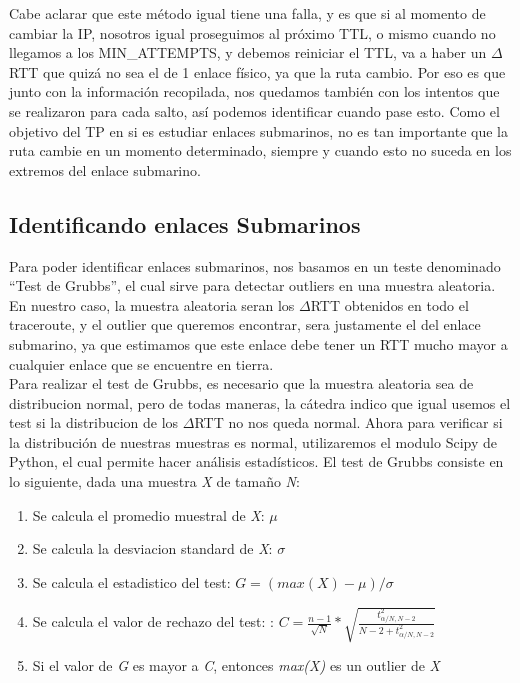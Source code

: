 Cabe aclarar que este método igual tiene una falla, y es que si al momento de cambiar la IP, nosotros igual proseguimos al próximo TTL, o mismo cuando no llegamos a los MIN\_ATTEMPTS, y debemos reiniciar el TTL, va a haber un $\Delta$RTT que quizá no sea el de 1 enlace físico, ya que la ruta cambio. Por eso es que junto con la información recopilada, nos quedamos también con los intentos que se realizaron para cada salto, así podemos identificar cuando pase esto. Como el objetivo del TP en si es estudiar enlaces submarinos, no es tan importante que la ruta cambie en un momento determinado, siempre y cuando esto no suceda en los extremos del enlace submarino.

\subsection{Identificando enlaces Submarinos}

Para poder identificar enlaces submarinos, nos basamos en un teste denominado ``Test de Grubbs'', el cual sirve para detectar outliers en una muestra aleatoria. En nuestro caso, la muestra aleatoria seran los $\Delta$RTT obtenidos en todo el traceroute, y el outlier que queremos encontrar, sera justamente el del enlace submarino, ya que estimamos que este enlace debe tener un RTT mucho mayor a cualquier enlace que se encuentre en tierra.\\ 

Para realizar el test de Grubbs, es necesario que la muestra aleatoria sea de distribucion normal, pero de todas maneras, la cátedra indico que igual usemos el test si la distribucion de los $\Delta$RTT no nos queda normal. Ahora para verificar si la distribución de nuestras muestras es normal, utilizaremos el modulo Scipy de Python, el cual permite hacer análisis estadísticos. El test de Grubbs consiste en lo siguiente, dada una muestra \textit{X} de tamaño \textit{N}:

\begin{enumerate}
	\item Se calcula el promedio muestral de \textit{X}: $\mu$
	\item Se calcula la desviacion standard de \textit{X}: $\sigma$
	\item Se calcula el estadistico del test: $G = (max(X) - \mu) / \sigma$
	\item Se calcula el valor de rechazo del test: : $C = \frac{n-1}{\sqrt{N}} * \sqrt{\frac{t_{\alpha/N,N-2}^2}{N-2+t_{\alpha/N,N-2}^2}}$
	\item Si el valor de \textit{G} es mayor a \textit{C}, entonces \textit{max(X)} es un outlier de \textit{X}
\end{enumerate}

